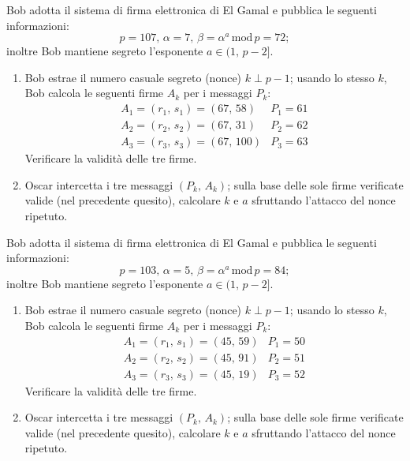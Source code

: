         Bob adotta il sistema di firma elettronica di El Gamal e pubblica le seguenti informazioni: \[
            p=107,\, \alpha = 7,\, \beta = \alpha^a\,\mathrm{mod}\,p=72
        ;\] inoltre Bob mantiene segreto l'esponente $a\in (1,\,p-2]$.
        \begin{enumerate}
            \item Bob estrae il numero casuale segreto (nonce) $k\perp p-1$; usando lo stesso $k$, 
                Bob calcola le seguenti firme $A_k$ per i messaggi $P_k$:
                \[\begin{array}{ll}
                    A_1=(r_1,\,s_1)=(67,\,58) & P_1=61\\
                    A_2=(r_2,\,s_2)=(67,\,31) & P_2=62\\
                    A_3=(r_3,\,s_3)=(67,\,100) & P_3=63
                \end{array}\]
                Verificare la validità delle tre firme.
            \item Oscar intercetta i tre messaggi $(P_k,\,A_k)$; sulla base delle sole firme verificate valide 
                (nel precedente quesito), calcolare $k$ e $a$ sfruttando l'attacco del nonce ripetuto.
        \end{enumerate}

        Bob adotta il sistema di firma elettronica di El Gamal e pubblica le seguenti informazioni: \[
            p=103,\, \alpha = 5,\, \beta = \alpha^a\,\mathrm{mod}\,p=84
        ;\] inoltre Bob mantiene segreto l'esponente $a\in (1,\,p-2]$.
        \begin{enumerate}
            \item Bob estrae il numero casuale segreto (nonce) $k\perp p-1$; usando lo stesso $k$, 
                Bob calcola le seguenti firme $A_k$ per i messaggi $P_k$:
                \[\begin{array}{ll}
                    A_1=(r_1,\,s_1)=(45,\,59) & P_1=50\\
                    A_2=(r_2,\,s_2)=(45,\,91) & P_2=51\\
                    A_3=(r_3,\,s_3)=(45,\,19) & P_3=52
                \end{array}\]
                Verificare la validità delle tre firme.
            \item Oscar intercetta i tre messaggi $(P_k,\,A_k)$; sulla base delle sole firme verificate valide 
                (nel precedente quesito), calcolare $k$ e $a$ sfruttando l'attacco del nonce ripetuto.
        \end{enumerate}

